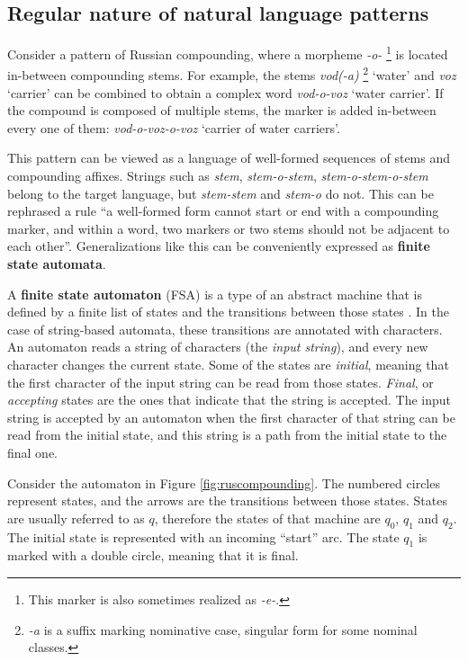 \subsection{Regular nature of natural language patterns}

Consider a pattern of Russian compounding, where a morpheme \emph{-o-}%
\footnote{This marker is also sometimes realized as \emph{-e-}.}
 is located in-between compounding stems.
For example, the stems \emph{vod(-a)}%
\footnote{\emph{-a} is a suffix marking nominative case, singular form for some nominal classes.}
 `water' and \emph{voz} `carrier' can be combined to obtain a complex word \emph{vod-o-voz} `water carrier'.
If the compound is composed of multiple stems, the marker is added in-between every one of them: \emph{vod-o-voz-o-voz} `carrier of water carriers'.

This pattern can be viewed as a language of well-formed sequences of stems and compounding affixes.
Strings such as \emph{stem}, \emph{stem-o-stem}, \emph{stem-o-stem-o-stem} belong to the target language, but \emph{stem-stem} and \emph{stem-o} do not.
This can be rephrased a rule ``a well-formed form cannot start or end with a compounding marker, and within a word, two markers or two stems should not be adjacent to each other''.
Generalizations like this can be conveniently expressed as \textbf{finite state automata}.

A \textbf{finite state automaton} (FSA) is a type of an abstract machine that is defined by a finite list of states and the transitions between those states \citep{Lawson2003}.
In the case of string-based automata, these transitions are annotated with characters.
An automaton reads a string of characters (the \emph{input string}), and every new character changes the current state.
Some of the states are \emph{initial}, meaning that the first character of the input string can be read from those states.
\emph{Final}, or \emph{accepting} states are the ones that indicate that the string is accepted.
The input string is accepted by an automaton when the first character of that string can be read from the initial state, and this string is a path from the initial state to the final one.

Consider the automaton in Figure \ref{fig:ruscompounding}.
The numbered circles represent states, and the arrows are the transitions between those states.
States are usually referred to as $q$, therefore the states of that machine are $q_0$, $q_1$ and $q_2$. 
The initial state is represented with an incoming ``start'' arc.
The state $q_1$ is marked with a double circle, meaning that it is final.


